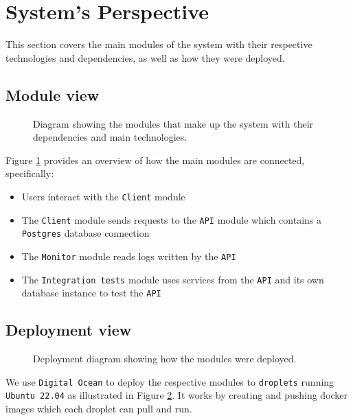\section{System's Perspective}
\label{ch:sys_persp} %

This section covers the main modules of the system with their  
respective technologies and dependencies, as well as how they
were deployed.

\subsection{Module view}

\begin{figure}[H]
    \centering
    
    \caption{Diagram showing the modules that make up the system with
    their dependencies and main technologies.}
    \label{fig:modules}
\end{figure}

Figure \ref{fig:modules} provides an overview of how the main modules are connected, specifically:
\begin{itemize}
    \item Users interact with the \texttt{Client} module
    \item The \texttt{Client} module sends requests to the \texttt{API} module which contains a \texttt{Postgres} database connection
    \item The \texttt{Monitor} module reads logs written by the \texttt{API}
    \item The \texttt{Integration tests} module uses services from the \texttt{API} and its own database instance to test the \texttt{API}
\end{itemize}

\subsection{Deployment view}

\begin{figure}[H]
      \centering
      \makebox[\linewidth]{
      }
      \caption{Deployment diagram showing how the modules were deployed.}
      \label{fig:deployment_diagram}
\end{figure}

We use \texttt{Digital Ocean} to deploy the respective modules to \texttt{droplets} running \texttt{Ubuntu 22.04} as illustrated in Figure \ref{fig:deployment_diagram}. It works by creating and pushing docker images which each droplet can pull and run.

